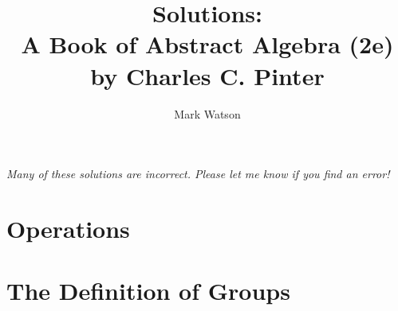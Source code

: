 \documentclass[12pt,letterpaper,onecolumn]{article}
\author{Mark Watson}
\title{Solutions:\\A Book of Abstract Algebra (2e)\\by Charles C. Pinter}
\begin{document}
\maketitle

\begin{small} \it{Many of these solutions are incorrect. Please let me know if you find an error!}
\end{small}



\section{Operations}


\section{The Definition of Groups}

\end{document}
